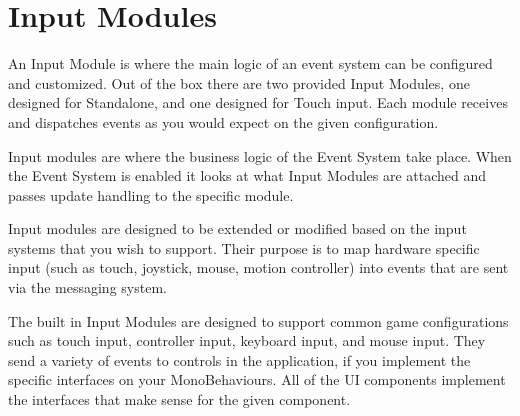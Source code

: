 \chapter{Input Modules}
\hypertarget{md__library_2_package_cache_2com_8unity_8ugui_0d1_80_80_2_documentation_0i_2_input_modules}{}\label{md__library_2_package_cache_2com_8unity_8ugui_0d1_80_80_2_documentation_0i_2_input_modules}
\label{md__library_2_package_cache_2com_8unity_8ugui_0d1_80_80_2_documentation_0i_2_input_modules_autotoc_md1337}%
%
 An Input Module is where the main logic of an event system can be configured and customized. Out of the box there are two provided Input Modules, one designed for Standalone, and one designed for Touch input. Each module receives and dispatches events as you would expect on the given configuration.

Input modules are where the \textquotesingle{}business logic\textquotesingle{} of the Event System take place. When the Event System is enabled it looks at what Input Modules are attached and passes update handling to the specific module.

Input modules are designed to be extended or modified based on the input systems that you wish to support. Their purpose is to map hardware specific input (such as touch, joystick, mouse, motion controller) into events that are sent via the messaging system.

The built in Input Modules are designed to support common game configurations such as touch input, controller input, keyboard input, and mouse input. They send a variety of events to controls in the application, if you implement the specific interfaces on your Mono\+Behaviours. All of the UI components implement the interfaces that make sense for the given component. 